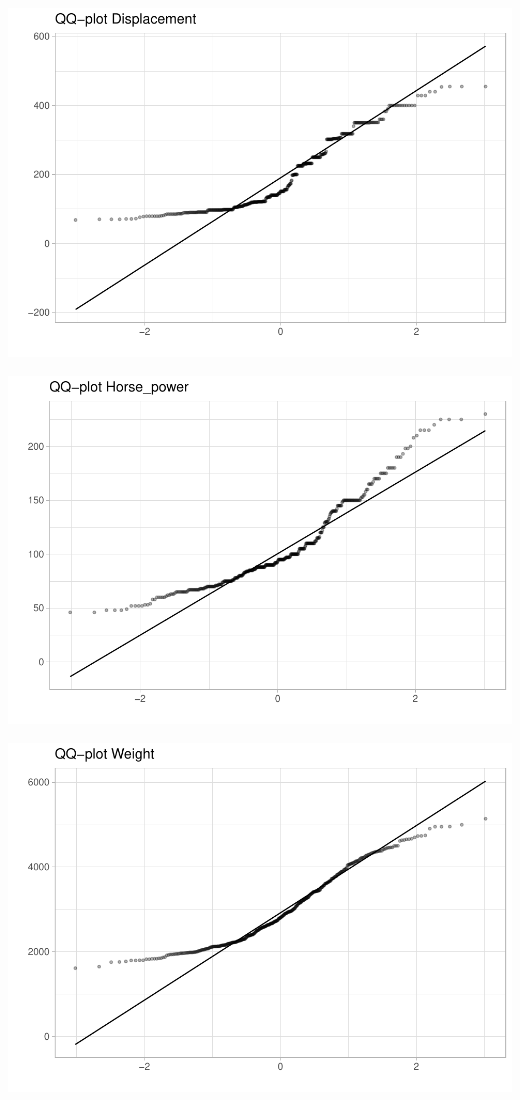 \documentclass[
]{article}
\begin{document}
\begin{center}\includegraphics{EDA_files/figure-latex/unnamed-chunk-14-1} \end{center}

\begin{center}\includegraphics{EDA_files/figure-latex/unnamed-chunk-14-2} \end{center}

\begin{center}\includegraphics{EDA_files/figure-latex/unnamed-chunk-14-3} \end{center}
\end{document}
